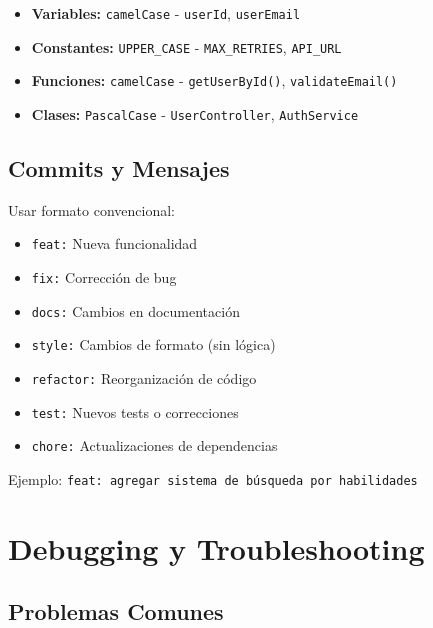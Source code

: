 \documentclass[a4paper]{report}
\begin{document}
\begin{itemize}
  \item \textbf{Variables:} \texttt{camelCase} - \texttt{userId}, \texttt{userEmail}
  \item \textbf{Constantes:} \texttt{UPPER\_CASE} - \texttt{MAX\_RETRIES}, \texttt{API\_URL}
  \item \textbf{Funciones:} \texttt{camelCase} - \texttt{getUserById()}, \texttt{validateEmail()}
  \item \textbf{Clases:} \texttt{PascalCase} - \texttt{UserController}, \texttt{AuthService}
\end{itemize}

\subsection{Commits y Mensajes}

Usar formato convencional:

\begin{itemize}
  \item \texttt{feat:} Nueva funcionalidad
  \item \texttt{fix:} Corrección de bug
  \item \texttt{docs:} Cambios en documentación
  \item \texttt{style:} Cambios de formato (sin lógica)
  \item \texttt{refactor:} Reorganización de código
  \item \texttt{test:} Nuevos tests o correcciones
  \item \texttt{chore:} Actualizaciones de dependencias
\end{itemize}

Ejemplo: \texttt{feat: agregar sistema de búsqueda por habilidades}

\section{Debugging y Troubleshooting}

\subsection{Problemas Comunes}
\end{document}

